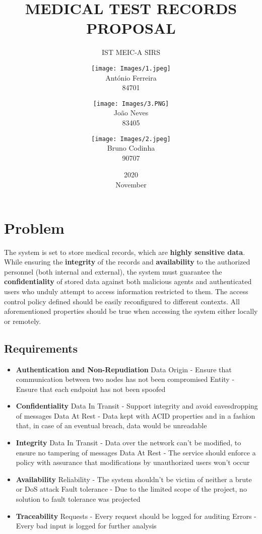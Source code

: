 \documentclass{article}
\title{MEDICAL TEST RECORDS\\ PROPOSAL}
\subtitle{IST MEIC-A SIRS}
\author{
	\texttt{[image: Images/1.jpeg]} \\
	António Ferreira  \\
	84701
	\and
	\texttt{[image: Images/3.PNG]} \\
	João Neves \\
	83405
	\and
	\texttt{[image: Images/2.jpeg]} \\
	Bruno Codinha \\
	90707
}
\date{2020 \\ November}
\begin{document}
\maketitle

\pagebreak

\section{Problem}
The system is set to store medical records, which are \textbf{highly sensitive data}.
While ensuring the \textbf{integrity} of the records and \textbf{availability} to the authorized personnel (both internal and external), the system must guarantee the \textbf{confidentiality} of stored data against both malicious agents and authenticated users who unduly attempt to access information restricted to them. The access control policy defined should be easily reconfigured to different contexts. All aforementioned properties should be true when accessing the system either locally or remotely.


\subsection{Requirements}
\begin{itemize}
  \item \textbf{Authentication and Non-Repudiation}
\subitem Data Origin - Ensure that communication between two nodes has not been compromised
    \subitem Entity - Ensure that each endpoint has not been spoofed
  \item \textbf{Confidentiality}
    \subitem Data In Transit - Support integrity and avoid eavesdropping of messages
    \subitem Data At Rest - Data kept with ACID properties and in a fashion that, in case of an eventual breach, data would be unreadable
  \item \textbf{Integrity}
    \subitem Data In Transit - Data over the network can't be modified, to ensure no tampering of messages
    \subitem Data At Rest - The service should enforce a policy with assurance that modifications by unauthorized users won't occur
  \item \textbf{Availability}
    \subitem Reliability - The system shouldn't be victim of neither a brute or DoS attack
    \subitem Fault tolerance - Due to the limited scope of the project, no solution to fault tolerance was projected
  \item \textbf{Traceability}
    \subitem Requests - Every request should be logged for auditing
    \subitem Errors - Every bad input is logged for further analysis

\end{itemize}
\end{document}
